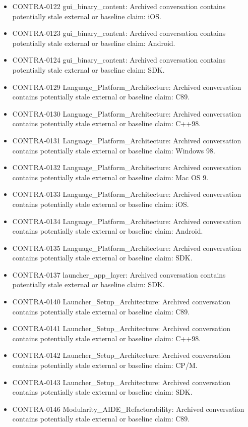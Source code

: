\documentclass[11pt,a4paper]{report}
\begin{document}
\begin{itemize}
\item CONTRA-0122 gui\_binary\_content: Archived conversation contains potentially stale external or baseline claim: iOS.
\item CONTRA-0123 gui\_binary\_content: Archived conversation contains potentially stale external or baseline claim: Android.
\item CONTRA-0124 gui\_binary\_content: Archived conversation contains potentially stale external or baseline claim: SDK.
\item CONTRA-0129 Language\_Platform\_Architecture: Archived conversation contains potentially stale external or baseline claim: C89.
\item CONTRA-0130 Language\_Platform\_Architecture: Archived conversation contains potentially stale external or baseline claim: C++98.
\item CONTRA-0131 Language\_Platform\_Architecture: Archived conversation contains potentially stale external or baseline claim: Windows 98.
\item CONTRA-0132 Language\_Platform\_Architecture: Archived conversation contains potentially stale external or baseline claim: Mac OS 9.
\item CONTRA-0133 Language\_Platform\_Architecture: Archived conversation contains potentially stale external or baseline claim: iOS.
\item CONTRA-0134 Language\_Platform\_Architecture: Archived conversation contains potentially stale external or baseline claim: Android.
\item CONTRA-0135 Language\_Platform\_Architecture: Archived conversation contains potentially stale external or baseline claim: SDK.
\item CONTRA-0137 launcher\_app\_layer: Archived conversation contains potentially stale external or baseline claim: SDK.
\item CONTRA-0140 Launcher\_Setup\_Architecture: Archived conversation contains potentially stale external or baseline claim: C89.
\item CONTRA-0141 Launcher\_Setup\_Architecture: Archived conversation contains potentially stale external or baseline claim: C++98.
\item CONTRA-0142 Launcher\_Setup\_Architecture: Archived conversation contains potentially stale external or baseline claim: CP/M.
\item CONTRA-0143 Launcher\_Setup\_Architecture: Archived conversation contains potentially stale external or baseline claim: SDK.
\item CONTRA-0146 Modularity\_AIDE\_Refactorability: Archived conversation contains potentially stale external or baseline claim: C89.

\end{itemize}
\end{document}
